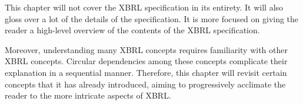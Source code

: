 This chapter will not cover the XBRL specification in its entirety.
It will also gloss over a lot of the details of the specification.
It is more focused on giving the reader a high-level overview of the contents of the XBRL specification.

Moreover, understanding many XBRL concepts requires familiarity with other XBRL concepts.
Circular dependencies among these concepts complicate their explanation in a sequential manner.
Therefore, this chapter will revisit certain concepts that it has already introduced,
aiming to progressively acclimate the reader to the more intricate aspects of XBRL.
